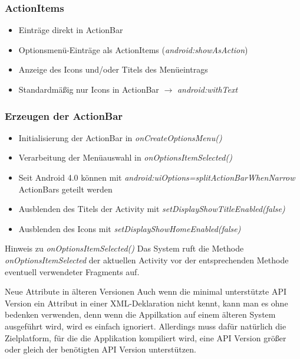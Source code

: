 \begin{frame}
   \frametitle{ActionItems}
   \begin{itemize}
      \item Einträge direkt in ActionBar
      \item Optionsmenü-Einträge als ActionItems (\emph{android:showAsAction})
      \item Anzeige des Icons und/oder Titels des Menüeintrags
      \item Standardmäßig nur Icons in ActionBar $\rightarrow$ \emph{android:withText}
   \end{itemize}

   
\end{frame}

\begin{frame}
   \frametitle{Erzeugen der ActionBar}
   \begin{itemize}
      \item Initialisierung der ActionBar in \emph{onCreateOptionsMenu()}
      \item Verarbeitung der Menüauswahl in \emph{onOptionsItemSelected()}
      \item Seit Android 4.0 können mit \emph{android:uiOptions=splitActionBarWhenNarrow} 
      	ActionBars geteilt werden
      \item Ausblenden des Titels der Activity mit \emph{setDisplayShowTitleEnabled(false)}
      \item Ausblenden des Icons mit \emph{setDisplayShowHomeEnabled(false)}
   \end{itemize}

   \begin{alertblock}{Hinweis zu \emph{onOptionsItemSelected()}}
      Das System ruft die Methode \emph{onOptionsItemSelected} der aktuellen Activity 
      vor der entsprechenden Methode eventuell verwendeter Fragments auf.
   \end{alertblock}

   \begin{alertblock}{Neue Attribute in älteren Versionen}
      Auch wenn die minimal unterstützte API Version ein Attribut in einer 
      XML-Deklaration nicht kennt, kann man es ohne bedenken verwenden, denn 
      wenn die Appilkation auf einem älteren System ausgeführt wird, wird es einfach ignoriert. 
      Allerdings muss dafür natürlich die Zielplatform, für die die Applikation 
      kompiliert wird, eine API Version größer oder gleich der benötigten API Version unterstützen.
   \end{alertblock}
\end{frame}

